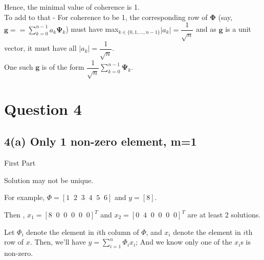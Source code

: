 \documentclass[fleqn, 11pt]{article}
\begin{document}
Hence, the minimal value of coherence is 1. \\
To add to that - For coherence to be 1, the corresponding row of $\boldsymbol{\Phi}$ (say, $\boldsymbol{g} = = \sum_{k=0}^{n-1} a_k \boldsymbol{\Psi}_k$) must have max$_{k \in \{0,1,...,n-1\}} |a_k| = \dfrac{1}{\sqrt{n}}$ and as $\boldsymbol{g}$ is a unit vector, it must have all $|a_k| = \dfrac{1}{\sqrt{n}}$. \\
One such $\boldsymbol{g}$ is of the form $\dfrac{1}{\sqrt{n}} \sum_{k=0}^{n-1} \boldsymbol{\Psi}_k$.




































\newpage
\section*{Question 4}
\setcounter{equation}{0}

\subsection*{4(a) Only 1 non-zero element, m=1}

{\textsf{First Part}}

Solution may not be unique. 

For example, $\Phi= [ 1 \;\; 2 \;\;  3 \;\;  4 \;\;  5 \;\;  6] $ and $y=[8]$.

Then ,      $x_1=[ 8 \;\;  0 \;\; 0 \;\; 0 \;\; 0 \;\; 0   ]^T $ and     
            $x_2=[ 0 \;\;  4 \;\; 0 \;\; 0 \;\; 0 \;\; 0 ]^T$ 
            are at least 2 solutions.


\medskip

Let $\Phi_i$ denote the element in $i$th column of $\Phi$, and 
$x_i$ denote the element in $i$th row of $x$. 
Then, we'll have $y=\displaystyle \sum_{i=1}^{n} \Phi_i x_i$; And we know only 
one of the $x_i$s is non-zero. 
\end{document}
